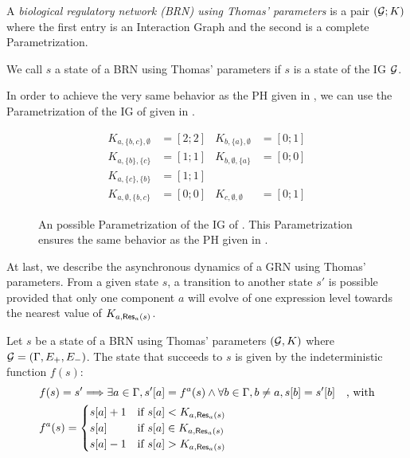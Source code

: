 \begin{definition}\label{def:brn}
A \emph{biological regulatory network (BRN) using Thomas' parameters} is a pair $(\mathcal{G}; K)$ where the first entry is an Interaction Graph and the second is a complete Parametrization.
\end{definition}
We call $s$ a state of a BRN using Thomas' parameters if $s$ is a state of the IG $\mathcal{G}$.

\begin{example*}
In order to achieve the very same behavior as the PH given in , we can use the Parametrization of the IG of  given in .

\begin{figure}[t]
\begin{align*}
K_{a,\{b,c\},\emptyset} &= [2 ; 2] & K_{b,\{a\},\emptyset} &= [0 ; 1] \\
K_{a,\{b\},\{c\}} &= [1 ; 1] & K_{b,\emptyset,\{a\}} &= [0 ; 0] \\
K_{a,\{c\},\{b\}} &= [1 ; 1] &&\\
K_{a,\emptyset,\{b,c\}} &= [0 ; 0] & K_{c,\emptyset,\emptyset} &= [0 ; 1]
\end{align*}
\caption{\label{fig:runningBRN-param}
An possible Parametrization of the IG of .
This Parametrization ensures the same behavior as the PH given in .
}
\end{figure}
\end{example*}

At last, we describe the asynchronous dynamics of a GRN using Thomas' parameters.
From a given state $s$, a transition to another state $s'$ is possible provided that only one component $a$ will evolve of one expression level towards the nearest value of $K_{a,\mathsf{Res}_{a}(s)}$.

\begin{definition}\label{def:dynamics}
Let $s$ be a state of a BRN using Thomas' parameters $(\mathcal{G}, K)$ where $\mathcal{G} = (\Gamma, E_+, E_-)$.
The state that succeeds to $s$ is given by the indeterministic function $f(s)$:
\begin{align*}
  & f(s) = s' \Longrightarrow \exists a \in \Gamma,
    {s'[a]} = f^a(s) \wedge
    \forall b \in \Gamma, b \neq a, {s[b]} = {s'[b]}
    \quad\text{, with}\\
  & f^a(s) =
  \begin{cases}
    {s[a]} + 1 & \text{if } {s[a]} < K_{a, \mathsf{Res}_{a}(s)} \\
    {s[a]} & \text{if } {s[a]} \in K_{a,\mathsf{Res}_{a}(s)}\\
    {s[a]} - 1 & \text{if } {s[a]} > K_{a,\mathsf{Res}_{a}(s)}
  \end{cases}
\end{align*}
\end{definition}

